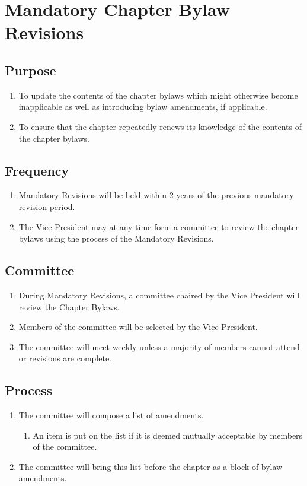 \chapter{Mandatory Chapter Bylaw Revisions}
\section{Purpose}
	\begin{enumerate}
		\item To update the contents of the chapter bylaws which might otherwise become inapplicable as well as introducing bylaw amendments, if applicable.
		\item To ensure that the chapter repeatedly renews its knowledge of the contents of the chapter bylaws.
	\end{enumerate}


\section{Frequency}
	\begin{enumerate}
		\item Mandatory Revisions will be held within 2 years of the previous mandatory revision period.
		\item The Vice President may at any time form a committee to review the chapter bylaws using the process of the Mandatory Revisions.
	\end{enumerate}

\section{Committee} 
	\label{bylaw-revisions}
	\begin{enumerate}
		\item During Mandatory Revisions, a committee chaired by the Vice President will review the Chapter Bylaws.
		\item Members of the committee will be selected by the Vice President.
		\item The committee will meet weekly unless a majority of members cannot attend or revisions are complete.
	\end{enumerate}

\section{Process}
	\begin{enumerate}
		\item The committee will compose a list of amendments.
		\begin{enumerate}
			\item An item is put on the list if it is deemed mutually acceptable by members of the committee.
		\end{enumerate}
		\item The committee will bring this list before the chapter as a block of bylaw amendments.
	\end{enumerate}
